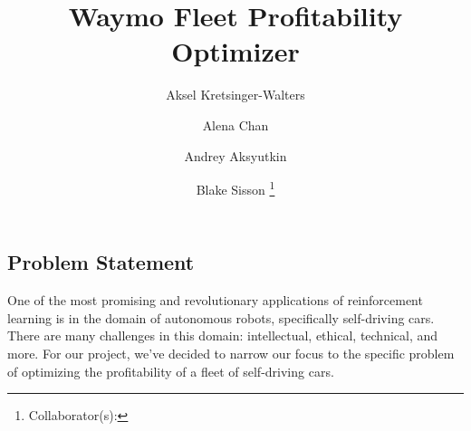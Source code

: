 \documentclass[12pt]{article}
\title{Waymo Fleet Profitability Optimizer}
\author{
		Aksel Kretsinger-Walters \and
		Alena Chan \and
		Andrey Aksyutkin \and
		Blake Sisson \footnote{Collaborator(s): \collaborators}
}
\date{}
\begin{document}
\maketitle

\subsection*{Problem Statement}
One of the most promising and revolutionary applications of reinforcement learning is in
the domain of autonomous robots, specifically self-driving cars. There are many challenges
in this domain: intellectual, ethical, technical, and more. For our project, we've decided
to narrow our focus to the specific problem of optimizing the profitability of a fleet of
self-driving cars.
\end{document}
